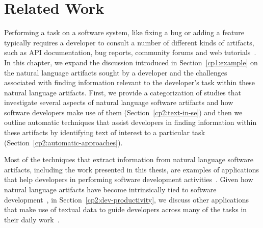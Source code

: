 \setcounter{chapter}{1}


\chapter{Related Work}
\label{ch:related-work}








Performing a task on a software system, like fixing a bug
or adding a feature typically requires a developer to consult
a number of different kinds of artifacts, such
as API documentation, bug reports, community forums
and web tutorials~\cite{umarji2008archetypal,Li2013}. 
In this chapter, 
we expand the discussion introduced in Section~\ref{cp1:example}
on the natural language 
artifacts sought by a developer  
and the challenges associated with finding information relevant to the developer's task
within these natural language artifacts. 
First, we provide 
a categorization of studies that investigate 
several aspects of natural language software artifacts 
and how software developers make use of them (Section~\ref{cp2:text-in-se})
and then we outline automatic techniques that
assist developers in finding information within these artifacts by 
identifying text of interest 
to a particular task (Section~\ref{cp2:automatic-approaches}).







Most of the techniques that extract information from natural language software artifacts, including the work presented in this thesis, 
are examples of applications that help developers in performing 
software development activities~\cite{Meyer2017}. 
Given how 
natural language artifacts have become intrinsically
tied to software development~\cite{liu2021, watson2022, umarji2008archetypal},
in Section~\ref{cp2:dev-productivity}, 
we discuss
other applications that make use of textual data
to guide developers
across many of the tasks in their daily work~\cite{Treude2016,  robillard2017, silva2019}.
















